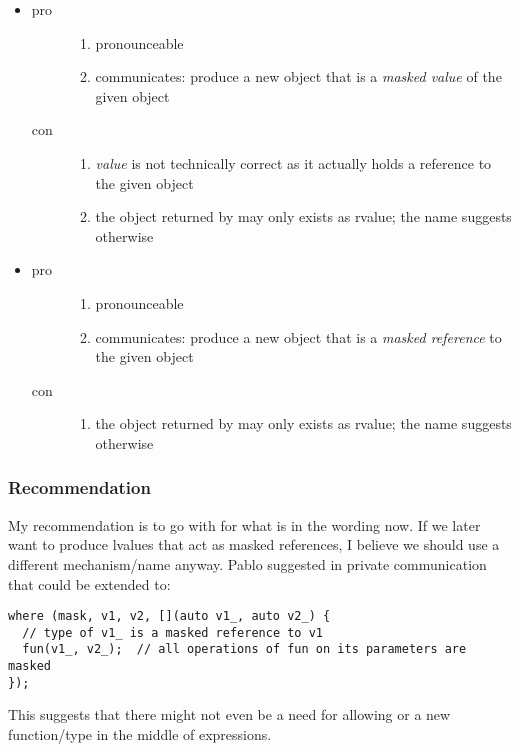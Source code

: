 \begin{itemize}
  \item {}
    \begin{description}
      \item[pro]
        \begin{enumerate}
          \item pronounceable
          \item communicates: produce a new object that is a \emph{masked value} of the given object
        \end{enumerate}
      \item[con]
        \begin{enumerate}
          \item \emph{value} is not technically correct as it actually holds a reference to the given object
          \item the object returned by  may only exists as rvalue;
            the name suggests otherwise
        \end{enumerate}
    \end{description}

  \item {}
    \begin{description}
      \item[pro]
        \begin{enumerate}
          \item pronounceable
          \item communicates: produce a new object that is a \emph{masked reference} to the given object
        \end{enumerate}
      \item[con]
        \begin{enumerate}
          \item the object returned by  may only exists as rvalue;
            the name suggests otherwise
        \end{enumerate}
    \end{description}

\end{itemize}

\subsubsection{Recommendation}
My recommendation is to go with  for what is in the wording now.
If we later want to produce lvalues that act as masked references, I believe we should use a different mechanism/name anyway.
Pablo suggested in private communication that  could be extended to:
\begin{lstlisting}[style=Vc]
where (mask, v1, v2, [](auto v1_, auto v2_) {
  // type of v1_ is a masked reference to v1
  fun(v1_, v2_);  // all operations of fun on its parameters are masked
});
\end{lstlisting}
This suggests that there might not even be a need for allowing  or a new function/type in the middle of expressions.

